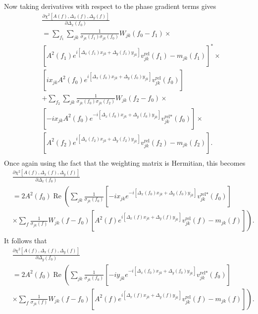 \documentclass{article}
\newcommand\re{\operatorname{Re}}
\begin{document}
Now taking derivatives with respect to the phase gradient terms gives
\begin{equation}
\begin{split}
    &\frac{\partial \chi^2[A(f), \Delta_x(f), \Delta_y(f)]}{\partial \Delta_x(f_0)} \\
    & = \sum_{f_1} \sum_{jk} \frac{1}{\sigma_{jk}(f_1)\sigma_{jk}(f_0)} W_{jk}(f_0-f_1) \times \\
    & \left[ A^2(f_1) e^{i[\Delta_x(f_1) x_{jk} + \Delta_y(f_1) y_{jk}]} v^\text{rel}_{jk}(f_1) - m_{jk}(f_1) \right]^* \times \\
    & \left[ i x_{jk} A^2(f_0) e^{i[\Delta_x(f_0) x_{jk} + \Delta_y(f_0) y_{jk}]} v^\text{rel}_{jk}(f_0) \right] \\
    & + \sum_{f_2} \sum_{jk} \frac{1}{\sigma_{jk}(f_0)\sigma_{jk}(f_2)} W_{jk}(f_2-f_0) \times \\
    & \left[ -i x_{jk} A^2(f_0) e^{-i[\Delta_x(f_0) x_{jk} + \Delta_y(f_0) y_{jk}]} v^{\text{rel}*}_{jk}(f_0) \right] \times \\
    & \left[ A^2(f_2) e^{i[\Delta_x(f_2) x_{jk} + \Delta_y(f_2) y_{jk}]} v^\text{rel}_{jk}(f_2) - m_{jk}(f_2) \right]. \\
\end{split}
\end{equation}
Once again using the fact that the weighting matrix is Hermitian, this becomes
\begin{equation}
\begin{split}
    &\frac{\partial \chi^2[A(f), \Delta_x(f), \Delta_y(f)]}{\partial \Delta_x(f_0)} \\
    & = 2 A^2(f_0) \re \left( \sum_{jk} \frac{1}{\sigma_{jk}(f_0)} \left[ -i x_{jk} e^{-i[\Delta_x(f_0) x_{jk} + \Delta_y(f_0) y_{jk}]} v^{\text{rel}*}_{jk}(f_0) \right] \right. \\
    & \left. \times \sum_{f} \frac{1}{\sigma_{jk}(f)} W_{jk}(f-f_0) \left[ A^2(f) e^{i[\Delta_x(f) x_{jk} + \Delta_y(f) y_{jk}]} v^\text{rel}_{jk}(f) - m_{jk}(f) \right] \right). \\
\end{split}
\end{equation}
It follows that
\begin{equation}
\begin{split}
    &\frac{\partial \chi^2[A(f), \Delta_x(f), \Delta_y(f)]}{\partial \Delta_y(f_0)} \\
    & = 2 A^2(f_0) \re \left( \sum_{jk} \frac{1}{\sigma_{jk}(f_0)} \left[ -i y_{jk}  e^{-i[\Delta_x(f_0) x_{jk} + \Delta_y(f_0) y_{jk}]} v^{\text{rel}*}_{jk}(f_0) \right] \right. \\
    & \left. \times \sum_{f} \frac{1}{\sigma_{jk}(f)} W_{jk}(f-f_0) \left[ A^2(f) e^{i[\Delta_x(f) x_{jk} + \Delta_y(f) y_{jk}]} v^\text{rel}_{jk}(f) - m_{jk}(f) \right] \right). \\
\end{split}
\end{equation}
\end{document}
